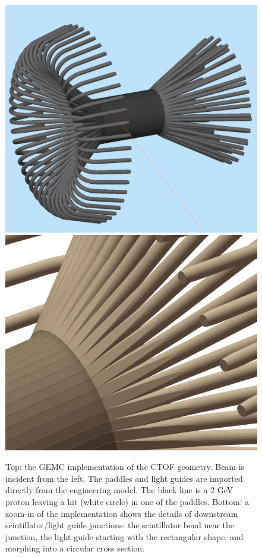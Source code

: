 \begin{figure}
	\centering
	\includegraphics[width=0.99\columnwidth,keepaspectratio]{img/ctofGeometry.png}
	\includegraphics[width=0.99\columnwidth,keepaspectratio]{img/ctofDetail.png}
	\caption{Top: the GEMC implementation of the CTOF geometry. Beam is incident from the left.
	         The paddles and light guides are imported directly from the engineering model.
			 The black line is a 2 GeV proton leaving a hit (white circle) in one of the paddles.
			 Bottom: a zoom-in of the implementation shows the details of downstream scintillator/light guide junctions:
			 the scintillator bend near the junction, the light guide starting with the rectangular shape,
			 and morphing into a circular cross section.}
	\label{fig:ctofGeometry}
\end{figure}



